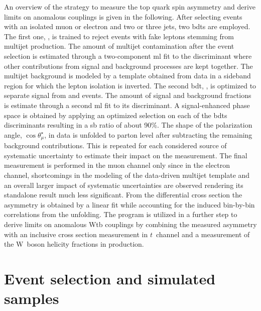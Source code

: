 An overview of the strategy to measure the top quark spin asymmetry and derive limits on anomalous couplings is given in the following. After selecting events with an isolated muon or electron and two or three jets, two \glspl{bdt} are employed. The first one, \bdtqcd, is trained to reject events with fake leptons stemming from multijet production. The amount of multijet contamination after the event selection is estimated through a two-component \gls{ml} fit to the \bdtqcd discriminant where other contributions from signal and background processes are kept together. The multijet background is modeled by a template obtained from data in a sideband region for which the lepton isolation is inverted. The second \gls{bdt}, \bdttch, is optimized to separate signal from \wjets and \ttbar events. The amount of signal and background fractions is estimate through a second \gls{ml} fit to its discriminant. A signal-enhanced phase space is obtained by applying an optimized selection on each of the \glspl{bdt} discriminants resulting in a \gls{sb} ratio of about 90\%. The shape of the polarization angle, $\cos\theta^\star_{\mu}$, in data is unfolded to parton level after subtracting the remaining background contributions. This is repeated for each considered source of systematic uncertainty to estimate their impact on the measurement. The final measurement is performed in the muon channel only since in the electron channel, shortcomings in the modeling of the data-driven multijet template and an overall larger impact of systematic uncertainties are observed rendering its standalone result much less significant. From the differential cross section the asymmetry is obtained by a linear fit while accounting for the induced bin-by-bin correlations from the unfolding. The \TOPFIT program is utilized in a further step to derive limits on anomalous Wtb couplings by combining the measured asymmetry with an inclusive cross section measurement in $t$~channel and a measurement of the W~boson helicity fractions in \ttbar production.



\section{Event selection and simulated samples}

